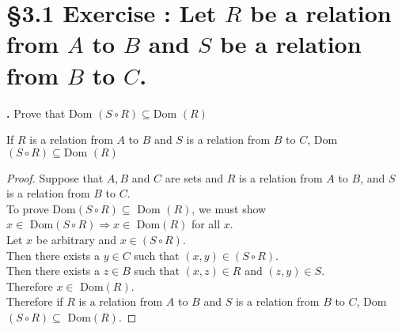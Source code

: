 \documentclass[a4paper,11pt]{article}
\begin{document}
{{\section*{\S 3.1 Exercise : Let \(R\) be a relation from \(A\) to \(B\) and \(S\) be a relation from \(B\) to \(C\).}
\setcounter{SubsectionCounter}{1}
\textbf{.}
Prove that Dom \({(S \circ R)} \subseteq \text{Dom } {(R)}\)
\begin{theorem1} If \(R\) is a relation from \(A\) to \(B\) and \(S\) is a relation from \(B\) to \(C\), Dom \({(S \circ R)} \subseteq \text{Dom } {(R)}\)
  \begin{proof}
    Suppose that \(A , B\) and \(C\) are sets and \(R\) is a relation from \(A\) to \(B\), and \(S\) is a relation from \(B\) to 
    \(C\).\\
    To prove Dom\({(S \circ R)} \subseteq\) Dom \({(R)}\), we must show\\ \(x \in\) 
    Dom\({(S \circ R)} \Rightarrow x \in\) Dom\({(R)}\) for all \(x\).\\
    Let \(x\) be arbitrary and \(x \in {(S \circ R)}\).\\
    Then there exists a \(y \in C\) such that \({(x,y)}\in{(S \circ R)}\).\\
    Then there exists a \(z \in B\) such that \({(x,z)}\in R\) and \({(z,y)}\in 
    S\).\\
    Therefore \(x \in\) Dom\({(R)}\).\\
    Therefore if \(R\) is a relation from \(A\) to \(B\) and \(S\) is a relation from \(B\) to \(C\), Dom\({(S \circ R)}\subseteq\) Dom\({(R)}\).
  \end{proof}
\end{theorem1}
\newpage
}}
\end{document}

